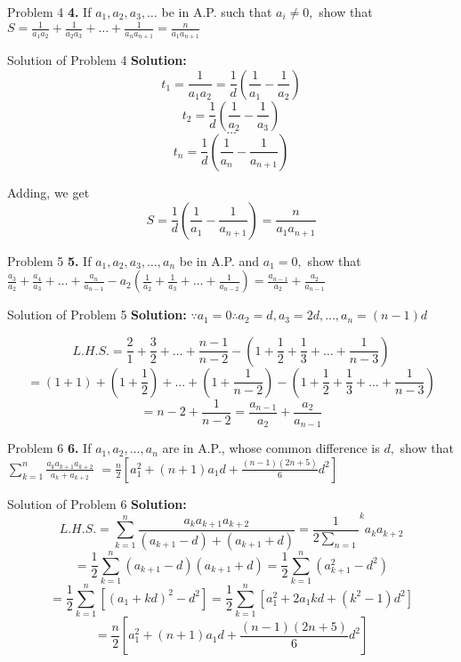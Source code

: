 \documentclass[aspectratio=1610,8pt]{beamer}
\begin{document}
\begin{frame}{Problem 4}
  \textbf{4.} If $a_1, a_2, a_3, \ldots$ be in A.P. such that $a_i\neq 0,$ show that $S = \frac{1}{a_1a_2} + \frac{1}{a_2a_3}
  + \ldots + \frac{1}{a_na_{n + 1}} = \frac{n}{a_1a_{n + 1}}$
\end{frame}
\begin{frame}{Solution of Problem 4}
  \textbf{Solution:} $$t_1 = \frac{1}{a_1a_2} = \frac{1}{d}\left(\frac{1}{a_1} - \frac{1}{a_2}\right)$$
  $$t_2 = \frac{1}{d}\left(\frac{1}{a_2} - \frac{1}{a_3}\right)$$
  $$\ldots$$
  $$t_n = \frac{1}{d}\left(\frac{1}{a_n} - \frac{1}{a_{n + 1}}\right)$$

  Adding, we get $$S = \frac{1}{d}\left(\frac{1}{a_1} - \frac{1}{a_{n + 1}}\right) = \frac{n}{a_1a_{n + 1}}$$
\end{frame}
\begin{frame}{Problem 5}
  \textbf{5.} If $a_1, a_2, a_3, \ldots, a_n$ be in A.P. and $a_1 = 0,$ show that $\frac{a_3}{a_2} + \frac{a_4}{a_3} + \ldots +
  \frac{a_n}{a_{n - 1}} - a_2\left(\frac{1}{a_2} + \frac{1}{a_3} + \ldots + \frac{1}{a_{n - 2}}\right) = \frac{a_{n - 1}}{a_2} +
  \frac{a_2}{a_{n - 1}}$
\end{frame}
\begin{frame}{Solution of Problem 5}
  \textbf{Solution:} $\because a_1 = 0 \therefore a_2 = d, a_3 = 2d, \ldots, a_n = (n - 1)d$

  $$L.H.S. = \frac{2}{1} + \frac{3}{2} + \ldots + \frac{n - 1}{n - 2} - \left(1 + \frac{1}{2} + \frac{1}{3} + \ldots + \frac{1}{n -
    3}\right)$$
  $$= (1 + 1) + \left(1 + \frac{1}{2}\right) + \ldots + \left(1 + \frac{1}{n - 2}\right) - \left(1 + \frac{1}{2} + \frac{1}{3} +
  \ldots + \frac{1}{n - 3}\right)$$
  $$= n - 2 + \frac{1}{n - 2} = \frac{a_{n - 1}}{a_2} + \frac{a_2}{a_{n - 1}}$$
\end{frame}
\begin{frame}{Problem 6}
  \textbf{6.} If $a_1, a_2, \ldots, a_n$ are in A.P., whose common difference is $d,$ show that $\sum_{k = 1}^n\frac{a_ka_{k +
      1}a_{k + 2}}{a_k+a_{k + 2}}$ $= \frac{n}{2}\left[a_1^2 + (n + 1)a_1d + \frac{(n - 1)(2n + 5)}{6}d^2\right]$
\end{frame}
\begin{frame}{Solution of Problem 6}
  \textbf{Solution:}$$L.H.S. = \sum_{k = 1}^n\frac{a_ka_{k + 1}a_{k + 2}}{(a_{k + 1} - d) + (a_{k + 1} + d)} = \frac{1}{2\sum_{n =
      1}}^ka_ka_{k + 2}$$
  $$= \frac{1}{2}\sum_{k = 1}^n(a_{k + 1} - d)(a_{k + 1} + d) = \frac{1}{2}\sum_{k = 1}^n(a_{k + 1}^2 - d^2)$$
  $$= \frac{1}{2}\sum_{k = 1}^n[(a_1 + kd)^2 - d^2] = \frac{1}{2}\sum_{k = 1}^n[a_1^2 + 2a_1kd + (k^2 - 1)d^2]$$
  $$= \frac{n}{2}\left[a_1^2 + (n + 1)a_1d + \frac{(n - 1)(2n + 5)}{6}d^2\right]$$
\end{frame}
\end{document}
